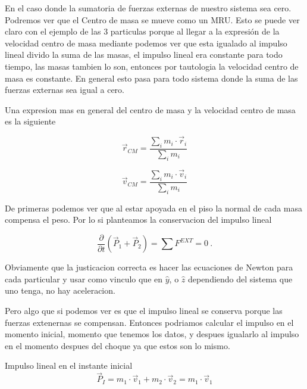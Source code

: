 \documentclass[../Main.tex]{subfiles}
\begin{document}
\hfill
\begin{minipage}[t]{0.6\textwidth}

En el caso donde la sumatoria de fuerzas externas de nuestro sistema sea cero.
Podremos ver que el Centro de masa se mueve como un MRU. Esto se puede ver
claro con el ejemplo de las 3 particulas porque al llegar a la expresión de
la velocidad centro de masa mediante podemos ver que esta igualado al impulso
lineal divido la suma de las masas, el impulso lineal era constante para todo
tiempo, las masas tambien lo son, entonces por tautologia la velocidad centro
de masa es constante. En general esto pasa para todo sistema donde la suma
de las fuerzas externas sea igual a cero.

Una expresion mas en general del centro de masa y la velocidad centro de masa
es la siguiente

\begin{equation*}
    \vec{r} _{CM} = \frac{\sum _i m_i \cdot \vec{r} _i}{\sum _i m_i}
\end{equation*}

\begin{equation*}
    \vec{v} _{CM} = \frac{\sum _i m_i \cdot \vec{v} _i}{\sum _i m_i}
\end{equation*}


De primeras podemos ver que al estar apoyada en el piso la normal de cada
masa compensa el peso. Por lo si planteamos la conservacion del impulso
lineal

\begin{equation*}
    \frac{\partial}{\partial t} \left( \vec{P} _1 + \vec{P} _2 \right) = \sum F^{EXT} = 0 \ .
\end{equation*}

Obviamente que la justicacion correcta es hacer las ecuaciones de Newton para 
cada particular y usar como vinculo que en $\hat{y}$, o $\hat{z}$ dependiendo
del sistema que uno tenga, no hay aceleracion.

Pero algo que si podemos ver es que el impulso lineal se conserva porque las
fuerzas extenernas se compensan. Entonces podriamos calcular el impulso en el
momento inicial, momento que tenemos los datos, y despues igualarlo al impulso
en el momento despues del choque ya que estos son lo mismo.

Impulso lineal en el instante inicial
\begin{equation*}
    \vec{P} _I = m_1 \cdot \vec{v} _1 + m_2 \cdot \vec{v} _2 = m_1 \cdot \vec{v} _1 
\end{equation*}

\end{minipage}
\end{document}
